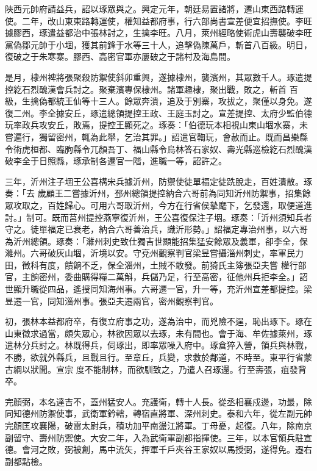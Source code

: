 \begin{pinyinscope}
 陜西元帥府請益兵，詔以琢眾與之。興定元年，朝廷易置諸將，遷山東西路轉運使。二年，改山東東路轉運使，權知益都府事，行六部尚書宣差便宜招撫使。李旺據膠西，琢遣益都治中張林討之，生擒李旺。八月，萊州經略使術虎山壽襲破李旺黨偽鄒元帥于小堌，獲其前鋒于水等三十人，追擊偽陳萬戶，斬首八百級。明日，復破之于朱寒寨。膠西、高密官軍亦屢破之于諸村及海島間。



 是月，棣州裨將張聚殺防禦使斜卯重興，遂據棣州，襲濱州，其眾數千人。琢遣提控紇石烈醜漢會兵討之。聚棄濱專保棣州。諸軍趣棣，聚出戰，敗之，斬首
 百級，生擒偽都統王仙等十三人。餘眾奔潰，追及于別寨，攻拔之，聚僅以身免。遂復二州。李全據安丘，琢遣總領提控王政、王庭玉討之。宣差提控、太府少監伯德玩率政兵攻安丘，敗焉，提控王顯死之。琢奏：「伯德玩本相視山東山堌水寨，未嘗遍行，獨留密州，輒為此舉，乞治其罪。」詔遣官鞫玩，會赦而止。既而昌樂縣令術虎桓都、臨朐縣令兀顏吾丁、福山縣令烏林答石家奴、壽光縣巡檢紇石烈醜漢破李全于日照縣，琢承制各遷官一階，進職一等，詔許之。



 三年，沂州注子堌王公喜構宋兵據沂州，防禦使徒單福定徒跣脫走，百姓潰散。琢奏：「去
 歲顧王二嘗據沂州，邳州總領提控納合六哥前為同知沂州防禦事，招集餘眾攻取之，百姓歸心。可用六哥取沂州，今方在行省侯摯麾下，乞發還，取便道進討。」制可。既而莒州提控燕寧復沂州，王公喜復保注子堌。琢奏：「沂州須知兵者守之。徒單福定已衰老，納合六哥善治兵，識沂形勢。」詔福定專治州事，以六哥為沂州總領。琢奏：「濰州刺史致仕獨吉世顯能招集猛安餘眾及義軍，卻李全，保濰州。六哥破灰山堌，沂境以安。守兗州觀察判官梁昱嘗攝淄州刺史，率軍民力田，徵科有度，饋餉不乏，保全淄州，土賊不敢發。前猗氏主簿張亞夫嘗
 權行部官，主餉密州，委曲購得糧二萬斛，兵儲乃足，行至高密，征他州兵拒李全。」詔世顯升職從四品，遙授同知海州事。六哥遷一官，升一等，充沂州宣差都提控。梁昱遷一官，同知淄州事。張亞夫遷兩官，密州觀察判官。



 初，張林本益都府卒，有復立府事之功，遂為治中，而兇險不逞，恥出琢下。琢在山東徵求過當，頗失眾心，林欲因眾以去琢，未有間也。會于海、牟佐據萊州，琢遣林分兵討之。林既得兵，伺琢出，即率眾噪入府中。琢倉猝入營，領兵與林戰，不勝，欲就外縣兵，且戰且行。至章丘，兵變，求救於鄰道，不時至。東平行省蒙古綱以狀聞。宣宗
 度不能制林，而欲馴致之，乃遣人召琢還。行至壽張，疽發背卒。



 完顏弼，本名達吉不，蓋州猛安人。充護衛，轉十人長。從丞相襄戍邊，功最，除同知德州防禦使事，武衛軍鈐轄，轉宿直將軍、深州刺史。泰和六年，從左副元帥完顏匡攻襄陽，破雷太尉兵，積功加平南盪江將軍。丁母憂，起復。八年，除南京副留守、壽州防禦使。大安二年，入為武衛軍副都指揮使。三年，以本官領兵駐宣德。會河之敗，弼被創，馬中流矢，押軍千戶夾谷王家奴以馬授弼，遂得免。遷右副都點檢。




\end{pinyinscope}
